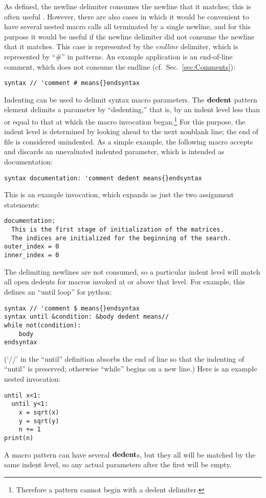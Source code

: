 \documentclass[12pt]{article}
\begin{document}
As defined, the newline delimiter consumes the newline that it matches; this is often useful .
However, there are also cases in which it would be convenient to have several nested macro calls all terminated by a single newline, and for this purpose it would be useful if the newline delimiter did not consume the newline that it matches.
This case is represented by the \emph{endline} delimiter, which is represented by ``\#'' in patterns.
An example application is an end-of-line comment, which does not consume the endline (cf.\ Sec.\ \ref{sec:Comments}):
\begin{lstlisting}[frame=single]
syntax // 'comment # means{}endsyntax
\end{lstlisting}
Indenting can be used to delimit syntax macro parameters.
The ${\bf dedent}$ pattern element delimits a parameter by ``dedenting,'' that is, by an indent level less than or equal to that at which the macro invocation began.\footnote{
Therefore a pattern cannot begin with a dedent delimiter.
}
For this purpose, the indent level is determined by looking ahead to the next nonblank line; 
the end of file is considered unindented.
As a simple example, the following macro accepts and discards an unevaluated indented parameter, which is intended as documentation:
\begin{lstlisting}[frame=single]
syntax documentation: 'comment dedent means{}endsyntax
\end{lstlisting}
This is an example invocation, which expands as just the two assignment statements:
\begin{lstlisting}[frame=single]
documentation:
  This is the first stage of initialization of the matrices.
  The indices are initialized for the beginning of the search.
outer_index = 0
inner_index = 0
\end{lstlisting}
The delimiting newlines are not consumed, so a particular indent level will match all open dedents for macros invoked at or above that level.
For example, this defines an ``until loop'' for python:
\begin{lstlisting}[frame=single]
syntax // 'comment $ means{}endsyntax
syntax until &condition: &body dedent means//
while not(condition):
    body 
endsyntax 
\end{lstlisting}
(`//' in the ``until'' definition absorbs the end of line so that the indenting of ``until'' is preserved;
otherwise ``while'' begins on a new line.)
Here is an example nested invocation:
\newpage %
\begin{lstlisting}[frame=single]
until x<1:
  until y<1:
    x = sqrt(x)
    y = sqrt(y)
    n += 1
print(n)
\end{lstlisting}
A macro pattern can have several ${\bf dedent}$s, but they all will be matched by the same indent level, so any actual parameters after the first will be empty.
\end{document}
